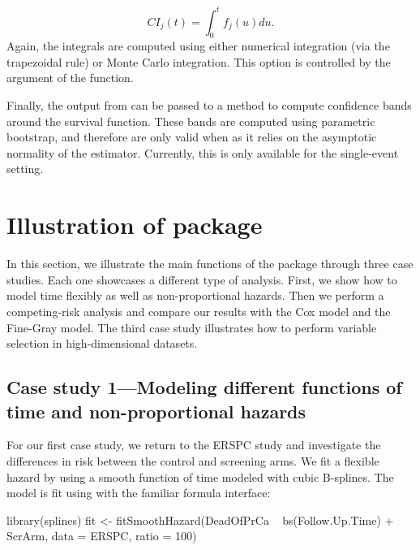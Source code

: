 \[ CI_j(t) = \int_0^t f_j(u)du.\] Again, the integrals are computed
using either numerical integration (via the trapezoidal rule) or Monte
Carlo integration. This option is controlled by the argument
 of the  function.

Finally, the output from  can be passed to a method
 to compute confidence bands around the survival function.
These bands are computed using parametric bootstrap, and therefore are
only valid when  as it relies on the asymptotic
normality of the estimator. Currently, this is only available for the
single-event setting.

\hypertarget{illustration-of-package}{%
\section{Illustration of package}\label{illustration-of-package}}

In this section, we illustrate the main functions of the 
package through three case studies. Each one showcases a different type
of analysis. First, we show how to model time flexibly as well as
non-proportional hazards. Then we perform a competing-risk analysis and
compare our results with the Cox model and the Fine-Gray model. The
third case study illustrates how to perform variable selection in
high-dimensional datasets.

\hypertarget{case-study-1modeling-different-functions-of-time-and-non-proportional-hazards}{%
\subsection{Case study 1---Modeling different functions of time and
non-proportional
hazards}\label{case-study-1modeling-different-functions-of-time-and-non-proportional-hazards}}

For our first case study, we return to the ERSPC study and investigate
the differences in risk between the control and screening arms. We fit a
flexible hazard by using a smooth function of time modeled with cubic
B-splines. The model is fit using  with the
familiar formula interface:

\begin{Schunk}
\begin{Sinput}
library(splines)
fit <- fitSmoothHazard(DeadOfPrCa ~ bs(Follow.Up.Time) + ScrArm, 
                       data = ERSPC, ratio = 100)
\end{Sinput}
\end{Schunk}

